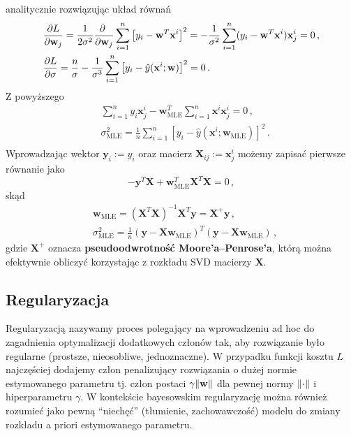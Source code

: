 \documentclass{myclass}
\numberwithin{equation}{section}
\begin{document}
analitycznie rozwiązując układ równań
\begin{equation}
    \begin{split}
        &\pdv{L}{\mathbf{w}_j} = \frac{1}{2\sigma^2}\pdv{~}{\mathbf{w}_j}\sum_{i=1}^n\left[y_i - \mathbf{w}^T\mathbf{x}^i\right]^2 = -\frac{1}{\sigma^2}\sum_{i=1}^n (y_i - \mathbf{w}^T\mathbf{x}^i)\mathbf{x}^i_j = 0\,,\\
        &\pdv{L}{\sigma} = \frac{n}{\sigma} - \frac{1}{\sigma^3}\sum_{i=1}^n \left[y_i - \hat{y}(\mathbf{x}^i; \mathbf{w})\right]^2 = 0\,.
    \end{split}
\end{equation}
Z powyższego
\begin{equation}
    \begin{split}
        &\sum_{i=1}^n y_i\mathbf{x}^i_j - \mathbf{w}_\mathrm{MLE}^T\sum_{i=1}^n\mathbf{x}^i\mathbf{x}^i_j = 0\,,\\
        &\sigma_\mathrm{MLE}^2 = \frac{1}{n} \sum_{i=1}^n \left[y_i - \hat{y}(\mathbf{x}^i; \mathbf{w}_\mathrm{MLE})\right]^2\,.\\
    \end{split}
\end{equation}
Wprowadzając wektor \(\mathbf{y}_i := y_i\) oraz macierz \(\mathbf{X}_{ij} := \mathbf{x}^i_j\) możemy
zapisać pierwsze równanie jako
\begin{equation}
    -\mathbf{y}^T\mathbf{X} + \mathbf{w}^T_\mathrm{MLE} \mathbf{X}^T\mathbf{X} = 0\,,
\end{equation}
skąd
\begin{equation}\boxed{
    \begin{split}
        &\mathbf{w}_\mathrm{MLE} = \left(\mathbf{X}^T\mathbf{X}\right)^{-1}\mathbf{X}^T\mathbf{y} = \mathbf{X}^+\mathbf{y}\,,\\
        &\sigma_\mathrm{MLE}^2 = \frac{1}{n}\left(\mathbf{y} - \mathbf{X}\mathbf{w}_\mathrm{MLE}\right)^T\left(\mathbf{y} - \mathbf{X}\mathbf{w}_\mathrm{MLE}\right)\,,
    \end{split}
}\end{equation}
gdzie \(\mathbf{X}^+\) oznacza \textbf{pseudoodwrotność Moore'a--Penrose'a}, którą można efektywnie
obliczyć korzystając z rozkładu SVD macierzy \(\mathbf{X}\).


\subsection{Regularyzacja}

Regularyzacją  nazywamy proces polegający na wprowadzeniu ad hoc do zagadnienia optymalizacji
dodatkowych członów tak, aby rozwiązanie było regularne (prostsze, nieosobliwe, jednoznaczne). W
przypadku funkcji kosztu \(L\) najczęściej dodajemy człon penalizujący rozwiązania o dużej normie
estymowanego parametru tj. człon postaci \(\gamma \norm{\mathbf{w}}\) dla pewnej normy
\(\norm{\cdot}\) i hiperparametru \(\gamma\). W kontekście bayesowskim regularyzację można również
rozumieć jako pewną \enquote{niechęć} (tłumienie, zachowawczość) modelu do zmiany rozkładu a priori
estymowanego parametru.
\end{document}
